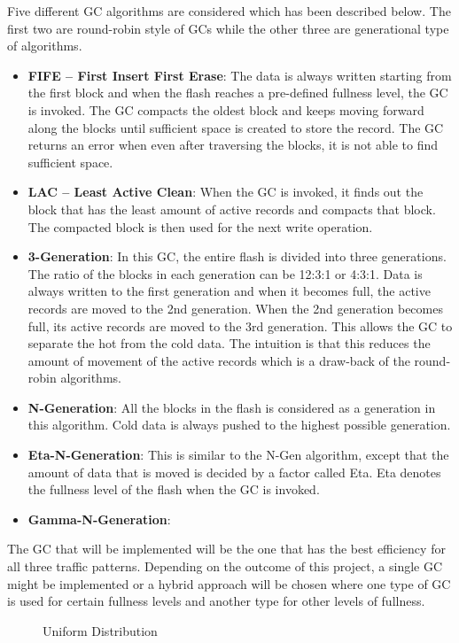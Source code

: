 Five different GC algorithms are considered which has been described below. The first two are round-robin style of GCs while the other three are generational type of algorithms.
\begin{itemize}
\item {\bf FIFE – First Insert First Erase}:
The data is always written starting from the first block and when the flash reaches a pre-defined fullness level, the GC is invoked. The GC compacts the oldest block and keeps moving forward along the blocks until sufficient space is created to store the record. The GC returns an error when even after traversing the blocks, it is not able to find sufficient space. 
\item {\bf LAC – Least Active Clean}:
When the GC is invoked, it finds out the block that has the least amount of active records and compacts that block. The compacted block is then used for the next write operation.
\item {\bf 3-Generation}:
In this GC, the entire flash is divided into three generations. The ratio of the blocks in each generation can be 12:3:1 or 4:3:1. Data is always written to the first generation and when it becomes full, the active records are moved to the 2nd generation. When the 2nd generation becomes full, its active records are moved to the 3rd generation. This allows the GC to separate the hot from the cold data. The intuition is that this reduces the amount of movement of the active records which is a draw-back of the round-robin algorithms.
\item {\bf N-Generation}:
All the blocks in the flash is considered as a generation in this algorithm. Cold data is always pushed to the highest possible generation.
\item {\bf Eta-N-Generation}:
This is similar to the N-Gen algorithm, except that the amount of data that is moved is decided by a factor called Eta. Eta denotes the fullness level of the flash when the GC is invoked.
\item {\bf Gamma-N-Generation}:
\end{itemize}	


The GC that will be implemented will be the one that has the best efficiency for all three traffic patterns. Depending on the outcome of this project, a single GC might be implemented or a hybrid approach will be chosen where one type of GC is used for certain fullness levels and another type for other levels of fullness.

\begin{figure}
\centering
	\caption{Uniform Distribution} 
	\label{fig:EcUND} 
\end{figure} 

